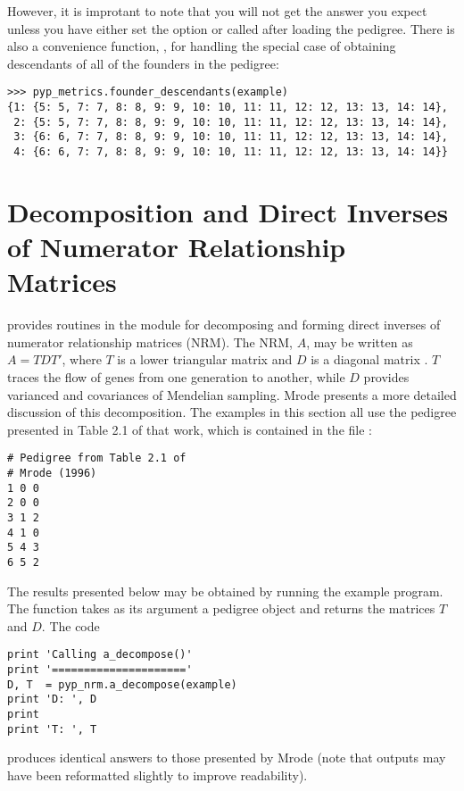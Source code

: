 However, it is improtant to note that you will not get the answer you expect unless you have either set the option  or called  after loading the pedigree. There is also a convenience function, , for handling the special case of obtaining descendants of all of the founders in the pedigree:
\begin{verbatim}
>>> pyp_metrics.founder_descendants(example)
{1: {5: 5, 7: 7, 8: 8, 9: 9, 10: 10, 11: 11, 12: 12, 13: 13, 14: 14},
 2: {5: 5, 7: 7, 8: 8, 9: 9, 10: 10, 11: 11, 12: 12, 13: 13, 14: 14},
 3: {6: 6, 7: 7, 8: 8, 9: 9, 10: 10, 11: 11, 12: 12, 13: 13, 14: 14},
 4: {6: 6, 7: 7, 8: 8, 9: 9, 10: 10, 11: 11, 12: 12, 13: 13, 14: 14}}
\end{verbatim}
\section{Decomposition and Direct Inverses of Numerator Relationship Matrices}\label{sec:computing-decomposition}
\PyPedal{} provides routines in the  module for decomposing and forming direct inverses of numerator relationship matrices (NRM). The NRM, $A$, may be written as $A=TDT'$, where $T$ is a lower triangular matrix and $D$ is a diagonal matrix \cite{ref143,ref1060}. $T$ traces the flow of genes from one generation to another, while $D$ provides varianced and covariances of Mendelian sampling. Mrode \citeyear{ref224} presents a more detailed discussion of this decomposition. The examples in this section all use the pedigree presented in Table 2.1 of that work, which is contained in the file :
\begin{verbatim}
# Pedigree from Table 2.1 of
# Mrode (1996)
1 0 0
2 0 0
3 1 2
4 1 0
5 4 3
6 5 2
\end{verbatim}
The results presented below may be obtained by running the  example program. The  function takes as its argument a pedigree object and returns the matrices $T$ and $D$. The code
\begin{verbatim}
print 'Calling a_decompose()'
print '====================='
D, T  = pyp_nrm.a_decompose(example)
print 'D: ', D
print
print 'T: ', T
\end{verbatim}
produces identical answers to those presented by Mrode \citeyear{ref224} (note that outputs may have been reformatted slightly to improve readability).
